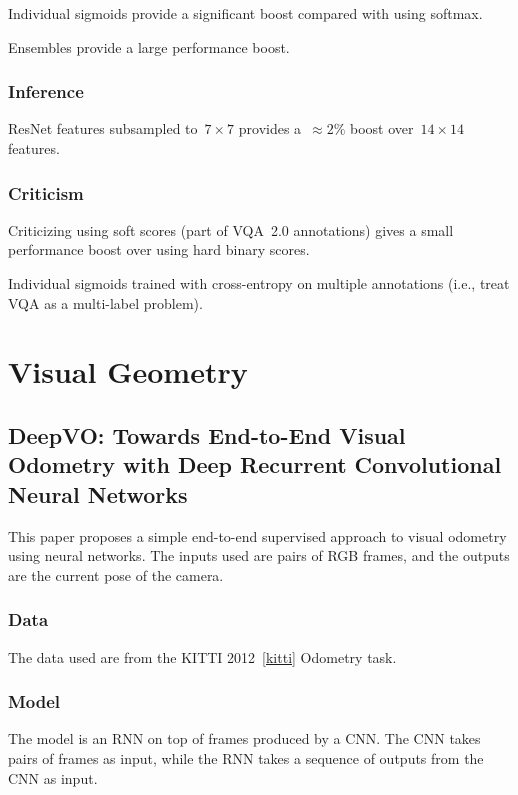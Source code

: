 \documentclass[a4paper, 12pt]{article}
\begin{document}
Individual sigmoids provide a significant boost compared with using softmax.

Ensembles provide a large performance boost.


\subsubsection{Inference}

ResNet features subsampled to~$7 \times 7$ provides a~$\approx 2\%$ boost
over~$14 \times 14$ features.


\subsubsection{Criticism}

Criticizing using soft scores (part of VQA~2.0 annotations) gives a small
performance boost over using hard binary scores.

Individual sigmoids trained with cross-entropy on multiple annotations (i.e.,
treat VQA as a multi-label problem).


\section{Visual Geometry}

\subsection{DeepVO\@: Towards End-to-End Visual Odometry with Deep Recurrent
            Convolutional Neural Networks~\citet{wang-deep-vo-2017}}

This paper proposes a simple end-to-end supervised approach to visual odometry
using neural networks. The inputs used are pairs of RGB frames, and the outputs
are the current pose of the camera.


\subsubsection{Data}

The data used are from the KITTI 2012~\ref{kitti} Odometry task.


\subsubsection{Model}

The model is an RNN on top of frames produced by a CNN\@. The CNN takes pairs
of frames as input, while the RNN takes a sequence of outputs from the CNN as
input.
\end{document}
